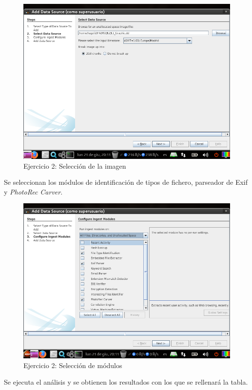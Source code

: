\documentclass[11pt]{article}
\begin{document}
\begin{figure}[H]
  \caption{Ejercicio 2: Selección de la imagen}
  \centering
  \includegraphics[scale=0.7]{e2-3.png}
\end{figure}

Se seleccionan los módulos de identificación de tipos de fichero, parseador de Exif y \textit{PhotoRec Carver}.

\begin{figure}[H]
  \caption{Ejercicio 2: Selección de módulos}
  \centering
  \includegraphics[scale=0.7]{e2-4.png}
\end{figure}

Se ejecuta el análisis y se obtienen los resultados con los que se rellenará la tabla.
\end{document}
